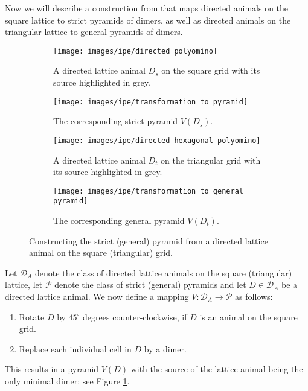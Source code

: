 Now we will describe a construction from \cite[p.~240]{LatticeAnimals} that maps directed animals on the square lattice to strict pyramids of dimers, as well as directed animals on the triangular lattice to general pyramids of dimers.

\begin{figure}[hbt!]
  \centering
  \begin{subfigure}{0.47 \textwidth}
    \centering
    \texttt{[image: images/ipe/directed polyomino]}
    \caption{A directed lattice animal $D_s$ on the square grid with its source highlighted in grey.}
  \end{subfigure}
  \hfill
  \begin{subfigure}{0.47 \textwidth}
    \centering
    \texttt{[image: images/ipe/transformation to pyramid]}
    \caption{The corresponding strict pyramid $V(D_s)$.}
  \end{subfigure}
  \begin{subfigure}{0.47 \textwidth}
    \centering
    \texttt{[image: images/ipe/directed hexagonal polyomino]}
    \caption{A directed lattice animal $D_t$ on the triangular grid with its source highlighted in grey.}
  \end{subfigure}
  \hfill
  \begin{subfigure}{0.47 \textwidth}
    \centering
    \texttt{[image: images/ipe/transformation to general pyramid]}
    \caption{The corresponding general pyramid $V(D_t)$.}
  \end{subfigure}
  \caption[Constructing pyramids from directed lattice animals.]{Constructing the strict (general) pyramid from a directed lattice animal on the square (triangular) grid.}
  \label{fig:directed_animals_correspondence}
\end{figure}

\begin{definition}
  Let $\mathcal{D}_A$ denote the class of directed lattice animals on the square (triangular) lattice, let $\mathcal{P}$ denote the class of strict (general) pyramids and let $D \in \mathcal{D}_A$ be a directed lattice animal. 
  We now define a mapping $V \colon \mathcal{D}_A \to \mathcal{P}$ as follows:
  \begin{enumerate}
    \item Rotate $D$ by $45^\circ$ degrees counter-clockwise, if $D$ is an animal on the square grid.
    \item Replace each individual cell in $D$ by a dimer.
  \end{enumerate}
  This results in a pyramid $V(D)$ with the source of the lattice animal being the only minimal dimer; see Figure \ref{fig:directed_animals_correspondence}.
\end{definition}

